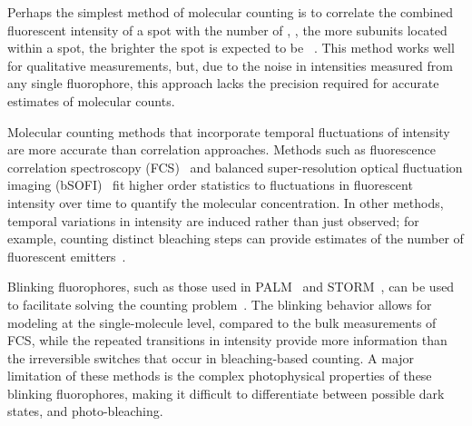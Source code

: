 %
%


%
Perhaps the simplest method of molecular counting is to correlate the combined
fluorescent intensity of a spot with the number of \smallobjects, \ie, the more subunits 
located within a spot, the brighter the spot is expected to be ~\citep{schmied_2012,
tolar_2005}.
  This method works well for qualitative measurements, but, due to the noise in
  intensities measured from any single fluorophore, this approach lacks the precision 
  required for accurate estimates of molecular counts. 

%
Molecular counting methods that incorporate temporal fluctuations of intensity
are more accurate than correlation approaches.
  Methods such as fluorescence correlation spectroscopy
  (FCS)~\citep{otsuka_2023,wachsmuth_2015,politi_2018} and balanced
  super-resolution optical fluctuation imaging
  (bSOFI)~\citep{geissbuehler_2012} fit higher order statistics to fluctuations
  in fluorescent intensity over time to quantify the molecular concentration.
  In other methods, temporal variations in intensity are induced rather than
  just observed; for example, counting distinct bleaching
  steps can provide estimates of the number of fluorescent
  emitters~\citep{ulbrich_2007,jain_2011,hummert_2021, garry_bayesian_2020}.

%
Blinking fluorophores, such as those used in
PALM~\citep{sengupta_pcPALM_2011,lee_counting_2012} and
STORM~\citep{patel_blinking_2021}, can be used to facilitate solving the counting
problem~\citep{rollins_stochastic_2015,nino_2017}.
  The blinking behavior allows for modeling at the single-molecule level, compared 
  to the bulk measurements of FCS, while the repeated transitions in
  intensity provide more information than the irreversible switches that occur 
  in bleaching-based counting.
  A major limitation of these methods is the complex photophysical properties of 
  these blinking fluorophores, making it difficult to differentiate between possible 
  dark states, and photo-bleaching. 

